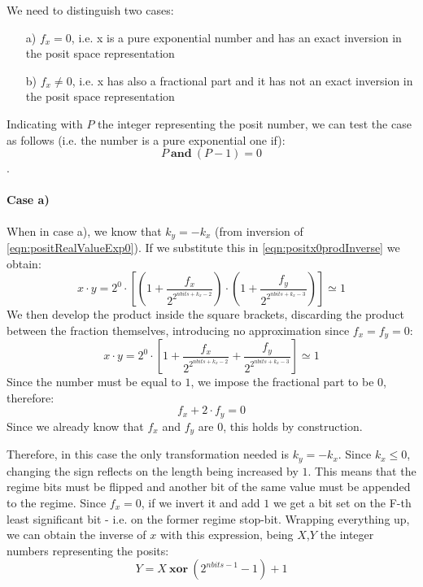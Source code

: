 We need to distinguish two cases:
\begin{itemize}
    \item[a)]$f_x = 0$, i.e. x is a pure exponential number and has an exact inversion in the posit space representation
    \item[b)] $f_x \neq 0$, i.e. x has also a fractional part and it has not an exact inversion in the posit space representation
\end{itemize}
Indicating with $P$ the integer representing the posit number, we can test the case as follows (i.e. the number is a pure exponential one if): 
\begin{equation}
    P\ \mathbf{and}\ (P - 1) = 0
\end{equation}.

\paragraph{Case a)} When in case a), we know that $k_y = -k_x$ (from inversion of \eqref{eqn:positRealValueExp0}). If we substitute this in \eqref{eqn:positx0prodInverse} we obtain:
\begin{equation}
    x \cdot y = 2^{0} \cdot \left[ \left (1 + \frac{f_x}{2^{2^{nbits + k_x - 2}}} \right ) \cdot \left (1 + \frac{f_y}{2^{2^{nbits + k_x - 3}}} \right ) \right] \simeq 1
\end{equation}
We then develop the product inside the square brackets, discarding the product between the fraction themselves, introducing no approximation since $f_x = f_y = 0$:
\begin{equation}
    x \cdot y = 2^{0} \cdot \left[ 1 + \frac{f_x}{2^{2^{nbits + k_x - 2}}}  + \frac{f_y}{2^{2^{nbits + k_x - 3}}} \right] \simeq 1
\end{equation}
Since the number must be equal to $1$, we impose the fractional part to be $0$, therefore:
\begin{equation}
    f_x + 2\cdot f_y = 0
\end{equation}
Since we already know that $f_x$ and $f_y$ are $0$, this holds by construction. 

Therefore, in this case the only transformation needed is $k_y = -k_x$. Since $k_x \leq 0$, changing the sign reflects on the length being increased by $1$. This means that the regime bits must be flipped and another bit of the same value must be appended to the regime. Since $f_x = 0$, if we invert it and add $1$ we get a bit set on the F-th least significant bit - i.e. on the former regime stop-bit. Wrapping everything up, we can obtain the inverse of $x$ with this expression, being $X$,$Y$ the integer numbers representing the posits:
\begin{equation}
    Y = X\ \mathbf{xor}\ (2^{nbits - 1} - 1) + 1
\end{equation}

